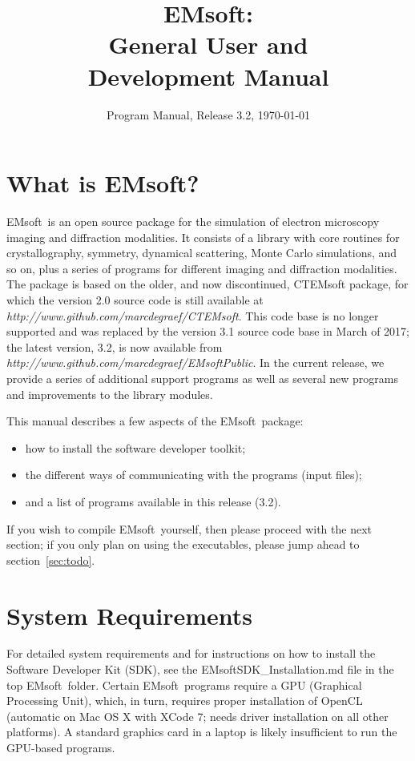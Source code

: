 \documentclass[DIV=calc, paper=letter, fontsize=11pt]{scrartcl}	 %
\title{EMsoft:\\ General User and\\ Development Manual} %
\author{\vspace*{-0.7in}} %
\date{Program Manual, Release 3.2, \today}
\newcommand{\ctp}{\textsf{EMsoft}}
\newcommand{\ctpb}{\textbf{\textsf{EMsoft}}}
\begin{document}
\maketitle

\renewcommand{\contentsname}{Table of Contents}
{\small\tableofcontents}

\newpage
\section{What is \ctpb?}
\ctp\ is an open source package for the simulation of electron microscopy imaging and diffraction modalities.  It consists of a library with
core routines for crystallography, symmetry, dynamical scattering, Monte Carlo simulations, and so on, plus a series of programs for  different imaging and diffraction modalities.
The package is based on the older, and now discontinued, \textsf{CTEMsoft} package, for which the version 2.0 source code is still
available at \textit{http://www.github.com/marcdegraef/CTEMsoft}.  This code base is no longer supported and was replaced
by the version 3.1 source code base in March of 2017; the latest version, 3.2, is now available from \textit{http://www.github.com/marcdegraef/EMsoftPublic}.  
In the current release, we provide a series of additional support programs as well as several new programs and improvements to the library modules.

This manual describes a few aspects of the \ctp\ package:
\begin{itemize}
\item how to install the software developer toolkit;
\item the different ways of communicating with the programs (input files);
\item and a list of programs available in this release (3.2).
\end{itemize}

If you wish to compile \ctp\ yourself, then please proceed with the next section; if you only plan on using the 
executables, please jump ahead to section~\ref{sec:todo}.

\section{System Requirements\label{sec:sysreq}}
For detailed system requirements and for instructions on how to install the Software Developer Kit (SDK), see the \textsf{EMsoftSDK\_Installation.md} file in the top \ctp\ folder.
Certain \ctp\ programs require a GPU (Graphical Processing Unit), which, in turn, requires proper installation of OpenCL (automatic on Mac OS X with XCode 7; needs driver 
installation on all other platforms).  A standard graphics card in a laptop is likely insufficient to run the GPU-based programs.
\end{document}
